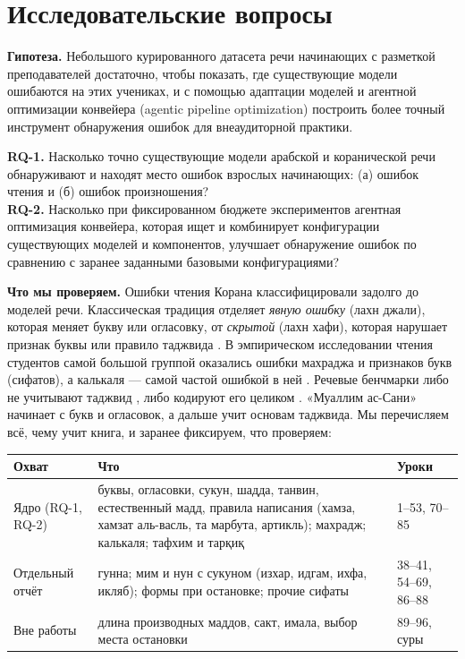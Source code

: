 \documentclass[a4paper,14pt]{extarticle}
\begin{document}
\section{Исследовательские вопросы}

\textbf{Гипотеза.} Небольшого курированного датасета речи начинающих с разметкой преподавателей достаточно,
чтобы показать, где существующие модели ошибаются на этих учениках, и с помощью адаптации моделей и
агентной оптимизации конвейера (agentic pipeline optimization) построить более точный инструмент
обнаружения ошибок для внеаудиторной практики.

\begin{rqbox}
\textbf{RQ-1.} Насколько точно существующие модели арабской и коранической речи обнаруживают и находят
место ошибок взрослых начинающих: (а) ошибок чтения и (б) ошибок произношения?\\[4pt]
\textbf{RQ-2.} Насколько при фиксированном бюджете экспериментов агентная оптимизация конвейера, которая
ищет и комбинирует конфигурации существующих моделей и компонентов, улучшает обнаружение ошибок по
сравнению с заранее заданными базовыми конфигурациями?
\end{rqbox}

\textbf{Что мы проверяем.} Ошибки чтения Корана классифицировали задолго до моделей речи. Классическая
традиция отделяет \emph{явную ошибку} (лахн джали), которая меняет букву или огласовку, от \emph{скрытой}
(лахн хафи), которая нарушает признак буквы или правило таджвида \cite{SRC-153}. В эмпирическом
исследовании чтения студентов самой большой группой оказались ошибки махраджа и признаков букв (сифатов), а
калькаля --- самой частой ошибкой в ней \cite{SRC-152}. Речевые бенчмарки либо не учитывают таджвид
\cite{SRC-004}, либо кодируют его целиком \cite{SRC-002}. «Муаллим ас-Сани» начинает с букв и огласовок, а
дальше учит основам таджвида. Мы перечисляем всё, чему учит книга, и заранее фиксируем, что проверяем:

\begin{center}\small
\begin{tabularx}{\linewidth}{@{}P{3.3cm}LP{2.6cm}@{}}
\toprule
Охват & Что & Уроки \\
\midrule
Ядро (RQ-1, RQ-2) & буквы, огласовки, сукун, шадда, танвин, естественный мадд, правила написания (хамза,
  хамзат аль-васль, та марбута, артикль); махрадж; калькаля; тафхим и тарқиқ & 1--53, 70--85 \\
Отдельный отчёт & гунна; мим и нун с сукуном (изхар, идгам, ихфа, икляб); формы при остановке; прочие
  сифаты & 38--41, 54--69, 86--88 \\
Вне работы & длина производных маддов, сакт, имала, выбор места остановки & 89--96, суры \\
\bottomrule
\end{tabularx}
\end{center}
\end{document}
